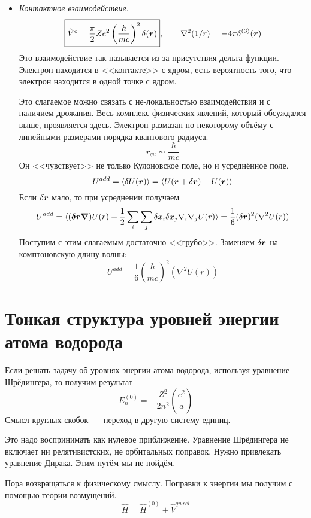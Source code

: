 \begin{itemize}
\begin{itemize}
{        Задача была решена в 1926 году. Оказалось, что спин испытывает дополнительную Томасовскую прецессию. Пришлось более точно анализировать формулы перехода в разных системах отсчёта.
        }
        )
      \end{itemize}
  \item \emph{Контактное взаимодействие}. 
  $$
  \boxed{
    \hat V^{c} = \dfrac{\pi}{2} Z e^2 \left(
        \dfrac{\hbar}{mc}
    \right)^2 \dta(\bf r)}, \qquad \nabla^2 (1/r) = -4 \pi \dta^{(3)} (\bf r)
  $$
  Это взаимодействие так называется из-за присутствия дельта-функции. Электрон находится в <<контакте>> с ядром, есть вероятность того, что электрон находится в одной точке с ядром.
  
  Это слагаемое можно связать с не-локальностью взаимодействия и с наличием дрожания. Весь комплекс физических явлений, который обсуждался выше, проявляется здесь. Электрон размазан по некоторому объёму с линейными размерами порядка квантового радиуса.
  $$
    r_{qu} \sim \dfrac{\hbar}{mc}
  $$
  Он <<чувствует>> не только Кулоновское поле, но и усреднённое поле.
  $$
    U^{add} = \langle \dta U(\bf r) \rangle = \langle U(\bf r + \dta \bf r) - U(\bf r) \rangle
  $$
  Если $\dta \bf r$ мало, то при усреднении получаем
  $$
    U^{add} = \langle
        (\bf{\dta r} \bf\nabla) U(r) + \dfrac{1}{2} \sum_{i} \sum_{j} \dta {x_i} \dta x_j \nabla_i \nabla_j U(r)
    \rangle = \dfrac{1}{6} (\dta \bf r)^2 (\nabla^2 U(r))
  $$
  Поступим с этим слагаемым достаточно <<грубо>>. Заменяем $\dta \bf r$ на комптоновскую длину волны:
  $$
  \boxed{
    U^{add} = \dfrac{1}{6} \left(
        \dfrac{\hbar}{mc}
    \right)^2 (\nabla^2 U(r))
  }
  $$
\end{itemize}

\section{Тонкая структура уровней энергии атома водорода}
\def \bf{\boldsymbol}
Если решать задачу об уровнях энергии атома водорода, используя уравнение Шрёдингера, то получим результат
$$
    E_n^{(0)} = -\dfrac{Z^2}{2 n^2} \left(
        \dfrac{e^2}{a}
    \right)
$$
Смысл круглых скобок~--- переход в другую систему единиц.

Это надо воспринимать как нулевое приближение. Уравнение Шрёдингера не включает ни релятивистских, не орбитальных поправок. Нужно привлекать уравнение Дирака. Этим путём мы не пойдём.

Пора возвращаться к физическому смыслу. Поправки к энергии мы получим с помощью теории возмущений.
$$
    \hat H = \hat H^{(0)} + \hat V^{qu\, rel}
$$ 
\def \l {\ell}
